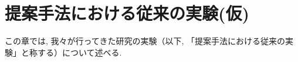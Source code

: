 \chapter{提案手法における従来の実験(仮)}
\label{chap:experiments_mech}
この章では, 我々が行ってきた研究\cite{mech}の実験（以下, 「提案手法における従来の実験」と称する）について述べる.
%
%
%
% 

% 
% 
%
